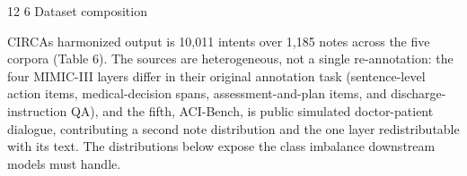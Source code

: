 \documentclass[3p,twocolumn]{elsarticle}
\makeatletter
\renewcommand\section{\@startsection {section}{1}{\z@}%
    {12\p@ \@plus 4\p@ \@minus 4\p@}%
    {6\p@ \@plus 4\p@ \@minus 3\p@}%
    {\normalsize\bfseries\boldmath}}
\makeatother
\begin{document}
\section{Dataset composition}\label{dataset-composition}

CIRCA\textquotesingle s harmonized output is 10,011 intents over 1,185 notes across the five corpora (Table 6). The sources are heterogeneous, not a single re-annotation: the four MIMIC-III layers differ in their original annotation task (sentence-level action items, medical-decision spans, assessment-and-plan items, and discharge-instruction QA), and the fifth, ACI-Bench, is public simulated doctor-patient dialogue, contributing a second note distribution and the one layer redistributable with its text. The distributions below expose the class imbalance downstream models must handle.
\end{document}
